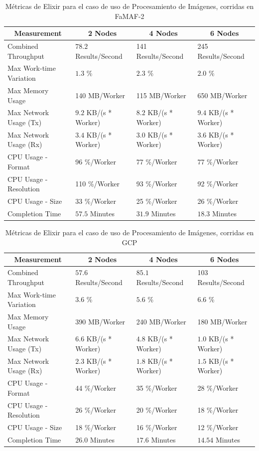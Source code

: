 \documentclass[11pt]{article}
\newcommand{\ipcap}[2]{\caption{Métricas de #1 para el caso de uso de Procesamiento de Imágenes, corridas en #2}}
\begin{document}
\begin{table}[H]
\centering
\begin{tabular}{|l|l|l|l|}
\hline
\multicolumn{1}{|c|}{Measurement} & \multicolumn{1}{c|}{2 Nodes} & \multicolumn{1}{c|}{4 Nodes} & \multicolumn{1}{c|}{6 Nodes} \\ \hline
Combined Throughput & $78.2$ Results/Second & 141 Results/Second & 245 Results/Second \\ \hline
Max Work-time Variation & $1.3$ \% & $2.3$ \% & $2.0$ \% \\ \hline
Max Memory Usage & 140 MB/Worker & 115 MB/Worker & 650 MB/Worker \\ \hline
Max Network Usage (Tx) & $9.2$ KB/(s * Worker) & $8.2$ KB/(s * Worker) & $9.4$ KB/(s * Worker) \\ \hline
Max Network Usage (Rx) & $3.4$ KB/(s * Worker) & $3.0$ KB/(s * Worker) & $3.6$ KB/(s * Worker) \\ \hline
CPU Usage - Format & 96 \%/Worker & 77 \%/Worker & 77 \%/Worker \\ \hline
CPU Usage - Resolution & 110 \%/Worker & 93 \%/Worker & 92 \%/Worker \\ \hline
CPU Usage - Size & 33 \%/Worker & 25 \%/Worker & 26 \%/Worker \\ \hline
Completion Time & $57.5$ Minutes & $31.9$ Minutes & $18.3$ Minutes \\ \hline
\end{tabular}
\ipcap{Elixir}{FaMAF-2}
\end{table}

\begin{table}[H]
\centering
\begin{tabular}{|l|l|l|l|}
\hline
\multicolumn{1}{|c|}{Measurement} & \multicolumn{1}{c|}{2 Nodes} & \multicolumn{1}{c|}{4 Nodes} & \multicolumn{1}{c|}{6 Nodes} \\ \hline
Combined Throughput & $57.6$ Results/Second & $85.1$ Results/Second & 103 Results/Second \\ \hline
Max Work-time Variation & $3.6$ \% & $5.6$ \% & $6.6$ \% \\ \hline
Max Memory Usage & 390 MB/Worker & 240 MB/Worker & 180 MB/Worker \\ \hline
Max Network Usage (Tx) & $6.6$ KB/(s * Worker) & $4.8$ KB/(s * Worker) & $1.0$ KB/(s * Worker) \\ \hline
Max Network Usage (Rx) & $2.3$ KB/(s * Worker) & $1.8$ KB/(s * Worker) & $1.5$ KB/(s * Worker) \\ \hline
CPU Usage - Format & 44 \%/Worker & 35 \%/Worker & 28 \%/Worker \\ \hline
CPU Usage - Resolution & 26 \%/Worker & 20 \%/Worker & 18 \%/Worker \\ \hline
CPU Usage - Size & 18 \%/Worker & 16 \%/Worker & 12 \%/Worker \\ \hline
Completion Time & $26.0$ Minutes & $17.6$ Minutes & $14.54$ Minutes \\ \hline
\end{tabular}
\ipcap{Elixir}{GCP}
\end{table}
\end{document}
